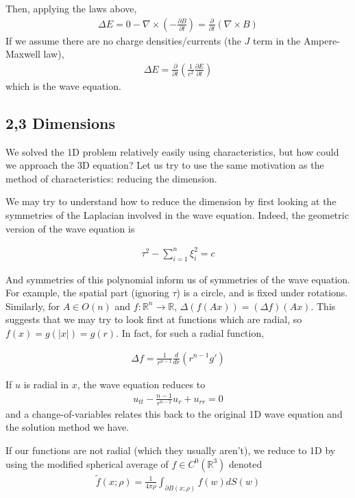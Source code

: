 \documentclass{article}
\newcommand{\R}{{\mathbb{R}}}
\newcommand{\pd}{\partial}
\begin{document}
	Then, applying the laws above, 
	\begin{align*}
		\Delta E = 0 - \nabla \times ( - \frac{\pd B}{\pd t}) = \frac{\pd}{\pd t} (\nabla \times B)
	\end{align*}
	If we assume there are no charge densities/currents (the $J$ term in the Ampere-Maxwell law),
	\begin{align*}
		\Delta E = \frac{\pd}{\pd t} ( \frac{1}{c^{2}} \frac{\pd E}{\pd t})
	\end{align*}
	which is the wave equation. 
	
	
	\subsection{2,3 Dimensions}
	
	We solved the 1D problem relatively easily using characteristics, but how could we approach the 3D equation? Let us try to use the same motivation as the method of characteristics: reducing the dimension. 
	
	We may try to understand how to reduce the dimension by first looking at the symmetries of the Laplacian involved in the wave equation. Indeed, the geometric version of the wave equation is 
	
	\begin{align*}
		\tau^{2} - \sum_{i=1}^{n} \xi_{i}^{2} = c
	\end{align*}
	
	And symmetries of this polynomial inform us of symmetries of the wave equation. For example, the spatial part (ignoring $\tau$) is a circle, and is fixed under rotations. Similarly, for $A \in O(n)$ and $f:\R^{n} \to \R$, $\Delta  (f(Ax)) = (\Delta f)(Ax)$. This suggests that we may try to look first at functions which are radial, so $f(x) = g(|x|) = g(r)$. In fact, for such a radial function,
	
	\begin{align*}
		\Delta f = \frac{1}{r^{n-1}} \frac{d}{dr}(r^{n-1} g')
	\end{align*} 
	
	If $u$ is radial in $x$, the wave equation reduces to 
	\begin{align*}
		u_{tt} - \frac{n-1}{r^{n-2}} u_{r} + u_{rr} = 0
	\end{align*}
	and a change-of-variables relates this back to the original 1D wave equation and the solution method we have. 
	
	If our functions are not radial (which they usually aren't), we reduce to 1D by using the modified spherical average of $f \in C^{0}(\R^{3})$ denoted
	\begin{align*}
		\tilde{f}(x;\rho) = \frac{1}{4 \pi \rho} \int_{\pd B(x;\rho)} f(w) dS(w)
	\end{align*}
	
\end{document}
